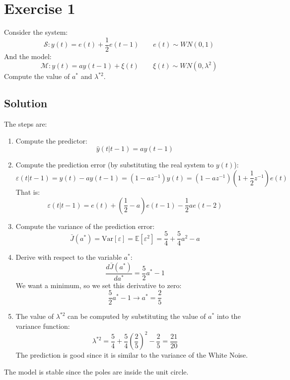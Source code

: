 \section{Exercise 1}

Consider the system: 
\[\mathcal{S}:y(t)=e(t)+\dfrac{1}{2}e(t-1)\qquad e(t)\sim WN(0,1)\]
And the model:
\[\mathcal{M}:y(t)=ay(t-1)+\xi(t)\qquad \xi(t)\sim WN(0,\lambda^2)\]
Compute the value of $a^\ast$ and $\lambda^{\ast 2}$.

\subsection*{Solution}
The steps are: 
\begin{enumerate}
    \item Compute the predictor:
        \[\hat{y}(t|t-1)=ay(t-1)\]
    \item Compute the prediction error (by substituting the real system to $y(t)$): 
        \[\varepsilon(t|t-1)=y(t)-ay(t-1)=\left(1-az^{-1}\right)y(t)=\left(1-az^{-1}\right)\left(1+\dfrac{1}{2}z^{-1}\right)e(t)\]
        That is: 
        \[\varepsilon(t|t-1)=e(t)+\left(\dfrac{1}{2}-a\right)e(t-1)-\dfrac{1}{2}ae(t-2)\]
    \item Compute the variance of the prediction error:
        \[\bar{J}(a^{\ast})=\text{Var}\left[\varepsilon\right]=\mathbb{E}\left[\varepsilon^2\right]=\dfrac{5}{4}+\dfrac{5}{4}a^2-a\]
    \item Derive with respect to the variable $a^{\ast}$: 
        \[\dfrac{d\bar{J}(a^{\ast})}{da^\ast}=\dfrac{5}{2}a^\ast-1\]
        We want a minimum, so we set this derivative to zero:
        \[\dfrac{5}{2}a^\ast-1\rightarrow a^\ast=\dfrac{2}{5}\]
    \item The value of $\lambda^{\ast 2}$ can be computed by substituting the value of $a^\ast$ into the variance function: 
        \[\lambda^{\ast 2}=\dfrac{5}{4}+\dfrac{5}{4}{\left(\dfrac{2}{5}\right)}^2-\dfrac{2}{5}=\dfrac{21}{20}\]
        The prediction is good since it is similar to the variance of the  White Noise. 
\end{enumerate}
The model is stable since the poles are inside the unit circle. 